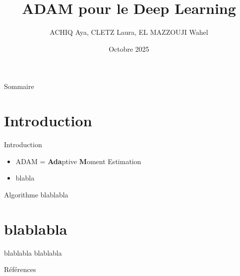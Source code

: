 \documentclass{beamer}
\title{ADAM pour le Deep Learning}
\author{ACHIQ Aya, CLETZ Laura, EL MAZZOUJI Wahel}
\date{Octobre 2025}
\begin{document}
\begin{frame}

  \titlepage

\end{frame}

\begin{frame}{Sommaire}

  \tableofcontents

\end{frame}

\section{Introduction}

\begin{frame}{Introduction}

  \begin{itemize}
    \item ADAM = \textbf{Ada}ptive \textbf{M}oment Estimation
    \item blabla
  \end{itemize}
  
\end{frame}

\begin{frame}{Algorithme}
  blablabla
\end{frame}

\section{blablabla}

\begin{frame}{blablabla}
  blablabla
\end{frame}

\begin{frame}{Références}
  \renewcommand*{\bibfont}{\small}
  \printbibliography[heading=none]
\end{frame}
\end{document}
